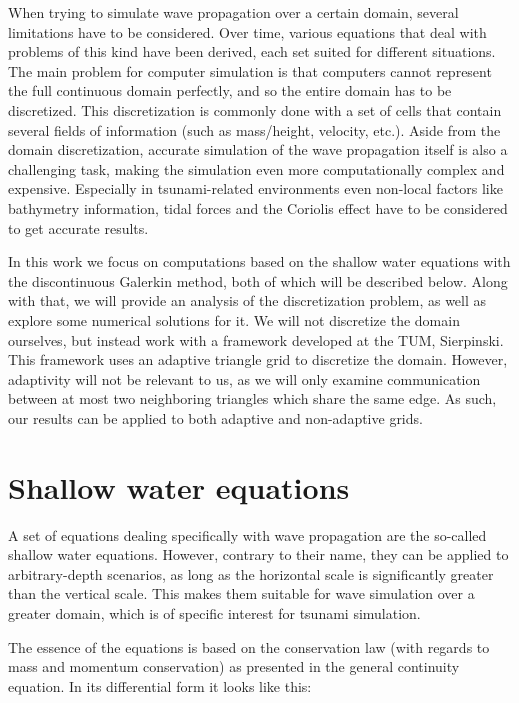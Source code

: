 \documentclass[a4paper, twoside]{article}
\begin{document}
When trying to simulate wave propagation over a certain domain, several limitations have to be considered.
Over time, various equations that deal with problems of this kind have been derived, each set suited for different situations.
The main problem for computer simulation is that computers cannot represent the full continuous domain perfectly, and so the entire domain has to be discretized.
This discretization is commonly done with a set of cells that contain several fields of information (such as mass/height, velocity, etc.).
Aside from the domain discretization, accurate simulation of the wave propagation itself is also a challenging task, making the simulation even more computationally complex and expensive.
Especially in tsunami-related environments even non-local factors like bathymetry information, tidal forces and the Coriolis effect have to be considered to get accurate results.

In this work we focus on computations based on the shallow water equations with the discontinuous Galerkin method, both of which will be described below.
Along with that, we will provide an analysis of the discretization problem, as well as explore some numerical solutions for it.
We will not discretize the domain ourselves, but instead work with a framework developed at the TUM, Sierpinski.
This framework uses an adaptive triangle grid to discretize the domain.
However, adaptivity will not be relevant to us, as we will only examine communication between at most two neighboring triangles which share the same edge.
As such, our results can be applied to both adaptive and non-adaptive grids.

\section{Shallow water equations}
\label{sec:shallow-water-equations}

A set of equations dealing specifically with wave propagation are the so-called shallow water equations. However, contrary to their name, they can be applied to arbitrary-depth scenarios, as long as the horizontal scale is significantly greater than the vertical scale. This makes them suitable for wave simulation over a greater domain, which is of specific interest for tsunami simulation.

The essence of the equations is based on the conservation law \cite{leveque2002finite} (with regards to mass and momentum conservation) as presented in the general continuity equation.
In its differential form it looks like this:
\end{document}
